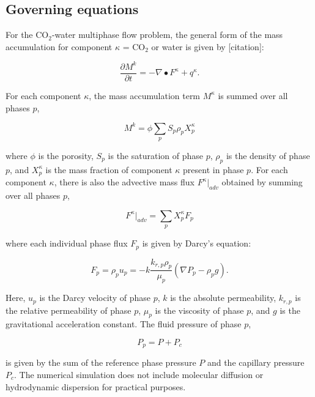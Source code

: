 \documentclass[default,iicol]{sn-jnl}
\begin{document}
\subsection{Governing equations}\label{subsec2_gov_eqs}
For the CO$_2$-water multiphase flow problem, the general form of the mass accumulation for component $\kappa$ = CO$_2$ or water is given by [citation]:

\begin{equation} \label{eq1}
    \frac{\partial M^k}{\partial t} = -\nabla \bullet F^\kappa + q^\kappa .
\end{equation}

For each component $\kappa$, the mass accumulation term $M^\kappa$ is summed over all phases $p$,

\begin{equation} \label{eq2}
    M^k = \phi \sum_p S_p \rho_p X_p^\kappa
\end{equation}

where $\phi$ is the porosity, $S_p$ is the saturation of phase $p$, $\rho_p$ is the density of phase $p$, and $X_p^\kappa$ is the mass fraction of component $\kappa$ present in phase $p$. For each component $\kappa$, there is also the advective mass flux $F^\kappa \rvert_{adv}$ obtained by summing over all phases $p$, 

\begin{equation} \label{eq3}
    F^\kappa \rvert_{adv} = \sum_p X_p^\kappa F_p
\end{equation}

where each individual phase flux $F_p$ is given by Darcy's equation:

\begin{equation} \label{eq4}
    F_p = \rho_p u_p = -k \frac{k_{r,p} \rho_p}{\mu_p} (\nabla P_p - \rho_p g).
\end{equation}

Here, $u_p$ is the Darcy velocity of phase $p$, $k$ is the absolute permeability, $k_{r,p}$ is the relative permeability of phase $p$, $\mu_p$ is the viscosity of phase $p$, and $g$ is the gravitational acceleration constant. The fluid pressure of phase $p$,

\begin{equation} \label{eq5}
    P_p = P + P_c
\end{equation}

is given by the sum of the reference phase pressure $P$ and the capillary pressure $P_c$. The numerical simulation does not include molecular diffusion or hydrodynamic dispersion for practical purposes.
\end{document}
